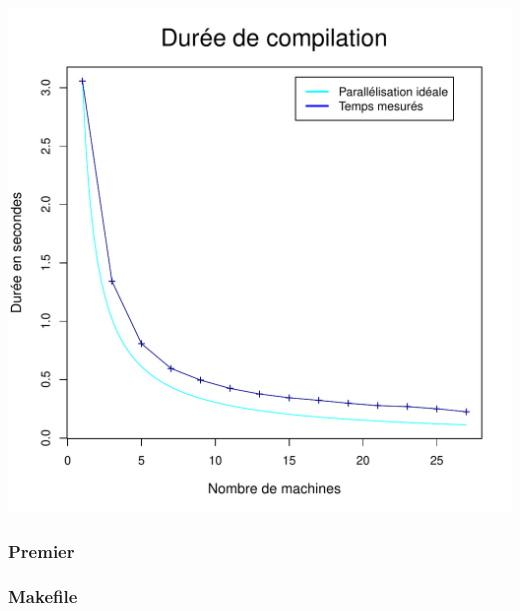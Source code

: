 \documentclass[a4paper, 11pt, titlepage]{article}
\begin{document}
\begin{center}
    \includegraphics[scale=0.45]{res/sujet_makefiles_matrix_Makefile_nth1.pdf}
\end{center}


\subsubsection {Premier}

\subsubsection* {Makefile}
\end{document}
